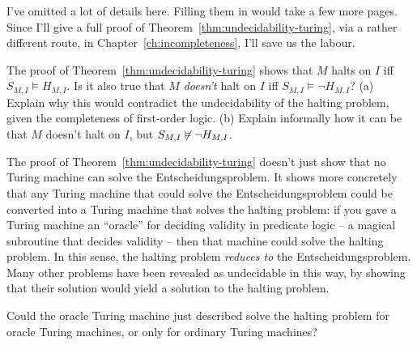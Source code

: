 I've omitted a lot of details here.
Filling them in would take a few more pages.
Since I'll give a full proof of Theorem~\ref{thm:undecidability-turing},
via a rather different route,
in Chapter~\ref{ch:incompleteness},
I'll save us the labour.

\begin{exercise}
  The proof of Theorem~\ref{thm:undecidability-turing} shows that
  $M$ halts on $I$ iff $S_{M,I} \models H_{M,I}$.
  Is it also true that $M$ \emph{doesn't} halt on $I$ iff $S_{M,I} \models \neg H_{M,I}$?
  (a) Explain why this would contradict
  the undecidability of the halting problem,
  given the completeness of first-order logic.
  (b) Explain informally how it can be that
  $M$ doesn't halt on $I$,
  but $S_{M,I} \not\vDash \neg H_{M,I}$.
\end{exercise}

The proof of Theorem~\ref{thm:undecidability-turing} doesn't just show that
no Turing machine can solve the Entscheidungsproblem.
It shows more concretely that
any Turing machine that could solve the Entscheidungsproblem
could be converted into a Turing machine that solves the halting problem:
if you gave a Turing machine an ``oracle'' for deciding validity in predicate logic
-- a magical subroutine that decides validity --
then that machine could solve the halting problem.
In this sense,
the halting problem \emph{reduces to} the Entscheidungsproblem.
Many other problems have been revealed as undecidable in this way,
by showing that their solution would yield a solution to the halting problem.

\begin{exercise}
  Could the oracle Turing machine just described solve
  the halting problem for oracle Turing machines,
  or only for ordinary Turing machines?
\end{exercise}






